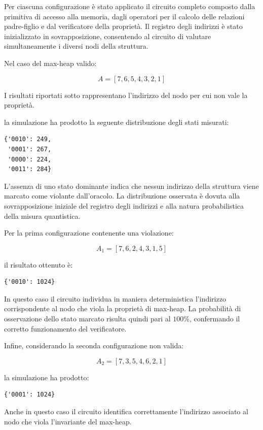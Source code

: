 Per ciascuna configurazione è stato applicato il circuito completo composto dalla primitiva di accesso alla memoria, dagli operatori per il calcolo delle relazioni padre-figlio e dal verificatore della proprietà. Il registro degli indirizzi è stato inizializzato in sovrapposizione, consentendo al circuito di valutare simultaneamente i diversi nodi della struttura.

Nel caso del max-heap valido:

\[
  A=[7,6,5,4,3,2,1]
\]

I risultati riportati sotto rappresentano l'indirizzo del nodo per cui non vale la proprietà.

la simulazione ha prodotto la seguente distribuzione degli stati misurati:

\begin{verbatim}
{'0010': 249,
 '0001': 267,
 '0000': 224,
 '0011': 284}
\end{verbatim}



L'assenza di uno stato dominante indica che nessun indirizzo della struttura viene marcato come violante dall'oracolo. La distribuzione osservata è dovuta alla sovrapposizione iniziale del registro degli indirizzi e alla natura probabilistica della misura quantistica.

Per la prima configurazione contenente una violazione:

\[
  A_1=[7,6,2,4,3,1,5]
\]

il risultato ottenuto è:

\begin{verbatim}
{'0010': 1024}
\end{verbatim}

In questo caso il circuito individua in maniera deterministica l'indirizzo corrispondente al nodo che viola la proprietà di max-heap. La probabilità di osservazione dello stato marcato risulta quindi pari al $100\%$, confermando il corretto funzionamento del verificatore.

Infine, considerando la seconda configurazione non valida:

\[
  A_2=[7,3,5,4,6,2,1]
\]

la simulazione ha prodotto:

\begin{verbatim}
{'0001': 1024}
\end{verbatim}

Anche in questo caso il circuito identifica correttamente l'indirizzo associato al nodo che viola l'invariante del max-heap.

